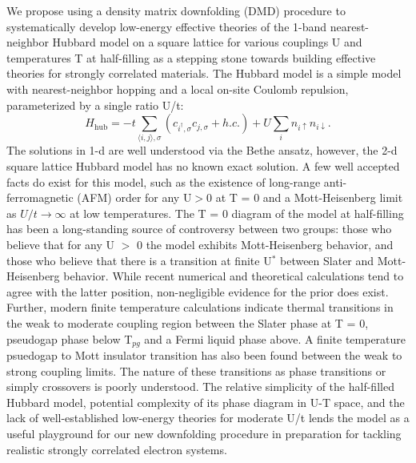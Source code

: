\documentclass[12pt]{article}
\begin{document}
We propose using a density matrix downfolding (DMD) procedure to systematically develop low-energy effective theories of the 1-band nearest-neighbor Hubbard model on a square lattice for various couplings U and temperatures T at half-filling as a stepping stone towards building effective theories for strongly correlated materials. 
The Hubbard model is a simple model with nearest-neighbor hopping and a local on-site Coulomb repulsion, parameterized by a single ratio U/t: 
\begin{equation}
H_\text{hub} = -t \sum_{\langle i,j \rangle,\sigma}( c_{i^\dagger,\sigma} c_{j,\sigma} + h.c.) + U \sum_i n_{i\uparrow} n_{i\downarrow}
\label{hubbard}.
\end{equation}
The solutions in 1-d are well understood via the Bethe ansatz, however, the 2-d square lattice Hubbard model has no known exact solution.  
A few well accepted facts do exist for this model, such as the existence of long-range anti-ferromagnetic (AFM) order for any U$>$0 at T = 0 and a Mott-Heisenberg limit as $U/t \rightarrow \infty$ at low temperatures.
The T = 0 diagram of the model at half-filling has been a long-standing source of controversy between two groups:  those who believe that for any U $>$ 0 the model exhibits Mott-Heisenberg behavior, and those who believe that there is a transition at finite U$^*$ between Slater and Mott-Heisenberg behavior.
While recent numerical and theoretical calculations tend to agree with the latter position, non-negligible evidence for the prior does exist. 
Further, modern finite temperature calculations indicate thermal transitions in the weak to moderate coupling region between the Slater phase at T = 0, pseudogap phase below T$_{pg}$ and a Fermi liquid phase above.
A finite temperature psuedogap to Mott insulator transition has also been found between the weak to strong coupling limits.
The nature of these transitions as phase transitions or simply crossovers is poorly understood.
The relative simplicity of the half-filled Hubbard model, potential complexity of its phase diagram in U-T space,  and the lack of well-established low-energy theories for moderate U/t lends the model as a useful playground for our new downfolding procedure in preparation for tackling realistic strongly correlated electron systems. 
\end{document}
